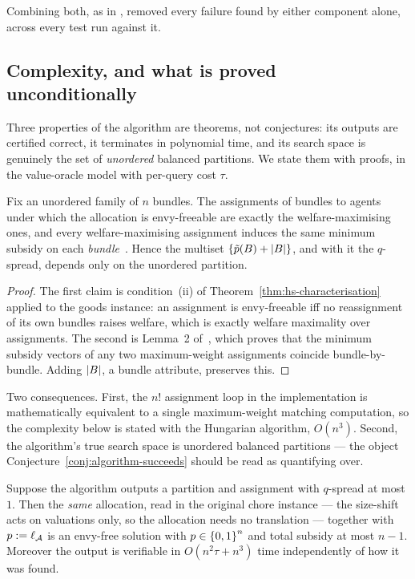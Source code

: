 Combining both, as in , removed every failure found
by either component alone, across every test run against it.

\subsection{Complexity, and what is proved unconditionally}
\label{sec:construct-repair-theory}

Three properties of the algorithm are theorems, not conjectures: its outputs
are certified correct, it terminates in polynomial time, and its search space
is genuinely the set of \emph{unordered} balanced partitions. We state them
with proofs, in the value-oracle model with per-query cost $\tau$.

\begin{lemma}
\label{lem:assignment-invariance}
Fix an unordered family of $n$ bundles. The assignments of bundles to agents
under which the allocation is envy-freeable are exactly the welfare-maximising
ones, and every welfare-maximising assignment induces the same minimum subsidy
on each \emph{bundle}~\cite[Lemma~2]{KMSTY24}. Hence the multiset
$\left\{\tilde{p}(B) + \left\lvert B\right\rvert\right\}$, and with it the $q$-spread, depends only
on the unordered partition.
\end{lemma}

\begin{proof}
The first claim is condition~(ii) of Theorem~\ref{thm:hs-characterisation}
applied to the goods instance: an assignment is envy-freeable iff no
reassignment of its own bundles raises welfare, which is exactly welfare
maximality over assignments. The second is Lemma~2 of~\cite{KMSTY24}, which
proves that the minimum subsidy vectors of any two maximum-weight assignments
coincide bundle-by-bundle. Adding $\left\lvert B\right\rvert$, a bundle attribute, preserves
this.
\end{proof}

Two consequences. First, the $n!$ assignment loop in the implementation is
mathematically equivalent to a single maximum-weight matching computation, so
the complexity below is stated with the Hungarian algorithm, $O(n^3)$.
Second, the algorithm's true search space is unordered balanced partitions ---
the object Conjecture~\ref{conj:algorithm-succeeds} should be read as
quantifying over.

\begin{theorem}
\label{thm:algorithm-soundness}
Suppose the algorithm outputs a partition and assignment with $q$-spread at
most $1$. Then the \emph{same} allocation, read in the original chore instance
--- the size-shift acts on valuations only, so the allocation needs no
translation --- together with $p := \ell_{\mathcal{A}}$ is an envy-free
solution with $p \in \left\{0,1\right\}^n$ and total subsidy at most $n-1$.
Moreover the output is verifiable in $O(n^2 \tau + n^3)$ time independently of
how it was found.
\end{theorem}

